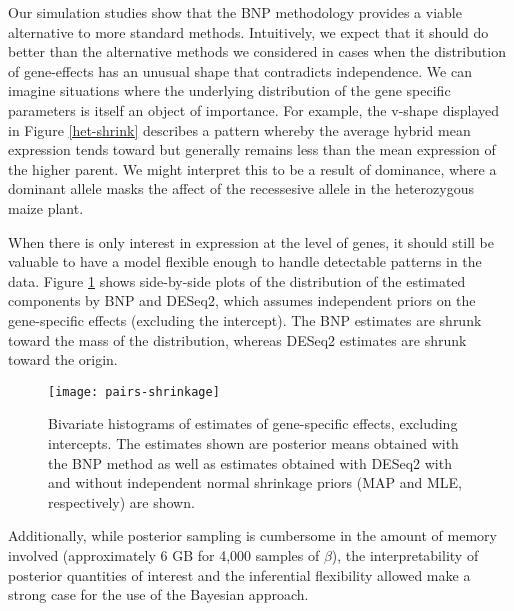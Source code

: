 \begin{itemize}
Our simulation studies show that the BNP methodology provides a viable alternative to more standard methods. Intuitively, we expect that it should do better than the alternative methods we considered in cases when the distribution of gene-effects has an unusual shape that contradicts independence. We can imagine situations where the underlying distribution of the gene specific parameters is itself an object of importance. For example, the v-shape displayed in Figure \ref{het-shrink} describes a pattern whereby the average hybrid mean expression tends toward but generally remains less than the mean expression of the higher parent. We might interpret this to be a result of dominance, where a dominant allele masks the affect of the recessesive allele in the heterozygous maize plant.

When there is only interest in expression at the level of genes, it should still be valuable to have a model flexible enough to handle detectable patterns in the data. Figure \ref{all-shrink} shows side-by-side plots of the distribution of the estimated components by BNP and DESeq2, which assumes independent priors on the gene-specific effects (excluding the intercept). The BNP estimates are shrunk toward the mass of the distribution, whereas DESeq2 estimates are shrunk toward the origin.


\begin{landscape}
\begin{figure}
\centering
\texttt{[image: pairs-shrinkage]}
\caption{Bivariate histograms of estimates of gene-specific effects, excluding intercepts. The estimates shown are posterior means obtained with the BNP method as well as estimates obtained with DESeq2 with and without independent normal shrinkage priors (MAP and MLE, respectively) are shown.}
\label{all-shrink}
\end{figure}
\end{landscape}

Additionally, while posterior sampling is cumbersome in the amount of memory involved (approximately 6 GB for 4,000 samples of $\beta$), the interpretability of posterior quantities of interest and the inferential flexibility allowed make a strong case for the use of the Bayesian approach.




\end{itemize}
